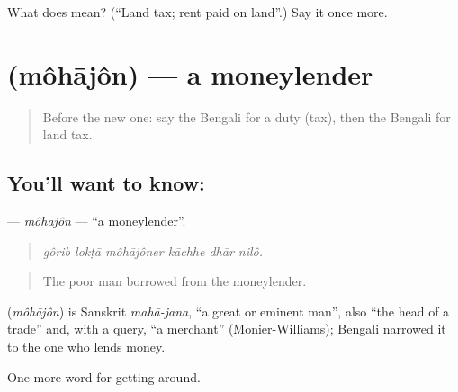 \begin{tcolorbox}[breakable,colback=teal!4,colframe=teal!35!black,title={Before you move on}]
What does  mean? (\textquotedblleft{}Land tax; rent paid on land\textquotedblright{}.) Say it once more.
\end{tcolorbox}
\section[\texorpdfstring{\bn{মহাজন} (môhājôn)}{মহাজন (môhājôn)}]{ (môhājôn) — a moneylender}

\label{lesson:BN-C418-mohajon}



\begin{quote}
Before the new one: say the Bengali for a duty (tax), then the Bengali for land tax.
\end{quote}

\subsection*{You'll want to know: }
\textbf{} — \emph{môhājôn} — \textquotedblleft{}a moneylender\textquotedblright{}.

\begin{quote}
     
\end{quote}

\begin{quote}
\emph{gôrib lokṭā môhājôner kāchhe dhār nilô.}
\end{quote}

\begin{quote}
The poor man borrowed from the moneylender.
\end{quote}

\begin{cousinweb}
\textbf{} (\emph{môhājôn}) is Sanskrit \emph{mahā-jana}, \textquotedblleft{}a great or eminent man\textquotedblright{}, also \textquotedblleft{}the head of a trade\textquotedblright{} and, with a query, \textquotedblleft{}a merchant\textquotedblright{} (Monier-Williams); Bengali narrowed it to the one who lends money.
\end{cousinweb}

\begin{grammarlens}[title={What you've built}]
One more word for getting around.
\end{grammarlens}

